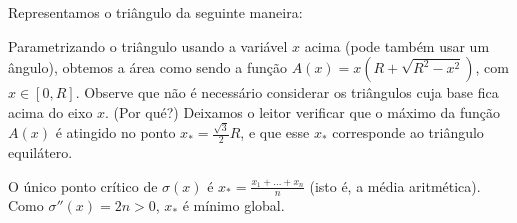 \begin{Solution}{7.13}
 Representamos o triângulo da seguinte maneira:
\begin{center}
\begin{bmlimage}\end{bmlimage}
\end{center}
Parametrizando o triângulo usando a variável $x$ acima (pode
também usar um ângulo),
obtemos a área como sendo a função
$A(x)=x(R+\sqrt{R^2-x^2})$, com $x\in [0,R]$.
Observe que não é necessário considerar os triângulos cuja
base fica acima do eixo $x$. (Por qué?)
Deixamos o leitor verificar que o máximo da função $A(x)$ é
atingido no ponto $x_*=\tfrac{\sqrt{3}}{2}R$, e que esse $x_*$
corresponde ao triângulo equilátero.
\end{Solution}
\begin{Solution}{7.14}
O único ponto crítico de $\sigma(x)$ é $x_*=\frac{x_1+\dots+ x_n}{n}$ (isto é,
a média aritmética). Como $\sigma''(x)=2n>0$, $x_*$ é mínimo global.
\end{Solution}
